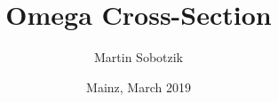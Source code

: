 \documentclass[
		10pt
		]{beamer}
\title[$\omega$ Cross-Section Studies] %
			{Omega Cross-Section} %
\subtitle{}
\date{Mainz, March 2019}
\author{Martin Sobotzik}
\institute[JGU Mainz]{
	Institute for Nuclear Physics\\ 
	Johannes Gutenberg-University of Mainz\\ 
}
\begin{document}
\maketitle

\end{document}
